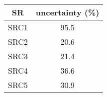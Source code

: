\begin{tabular}{|c|c|} \hline
{\bf SR} & {\bf uncertainty (\%)} \\ \hline
SRC1   & 95.5\\ \hline
SRC2   & 20.6\\ \hline
SRC3   & 21.4\\ \hline
SRC4   & 36.6\\ \hline
SRC5   & 30.9\\ \hline
\end{tabular}
